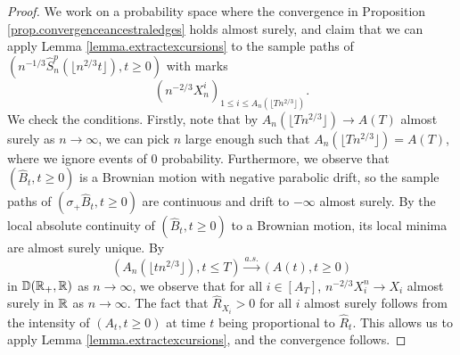 \begin{proof}
We work on a probability space where the convergence in Proposition \ref{prop.convergenceancestraledges} holds almost surely, and claim that we can apply Lemma \ref{lemma.extractexcursions} to the sample paths of $\left(n^{-1/3}\hat{S}^{p}_n\left(\lfloor n^{2/3}t\rfloor\right),t \geq 0\right)$ with marks $$\left(n^{-2/3}X_n^i\right)_{1\leq i\leq A_n\left(\lfloor T n^{2/3}\rfloor\right)}.$$ We check the conditions.
Firstly, note that by $A_n\left(\lfloor T n^{2/3}\rfloor\right)\to A\left(T\right)$ almost surely as $n\to \infty$, we can pick $n$ large enough such that $A_n\left(\lfloor T n^{2/3}\rfloor\right)=A\left(T\right)$, where we ignore events of $0$ probability. Furthermore, we observe that $(\hat{B}_t,t\geq 0)$ is a Brownian motion with negative parabolic drift, so the sample paths of $(\sigma_+\hat{B}_t,t\geq 0)$ are continuous and drift to $-\infty$ almost surely. By the local absolute continuity of $(\hat{B}_t,t\geq 0)$ to a Brownian motion, its local minima are almost surely unique. By 
$$\left(A_n\left(\lfloor t n^{2/3}\rfloor\right), t\leq T\right) \overset{a.s.}{\to}\left(A\left(t\right),t\geq 0\right)$$
in ${\mathbb D}({\mathbb R}_+,{\mathbb R})$ as $n\to \infty$, we observe that for all $i\in [A_T]$, $n^{-2/3}X_i^n\to X_i$ almost surely in ${\mathbb R}$ as $n\to \infty$. The fact that $\hat{R}_{X_i}>0$ for all $i$ almost surely follows from the intensity of $(A_t,t\geq 0)$ at time $t$ being proportional to $\hat{R}_t$. This allows us to apply Lemma \ref{lemma.extractexcursions}, and the convergence follows.
\end{proof}


